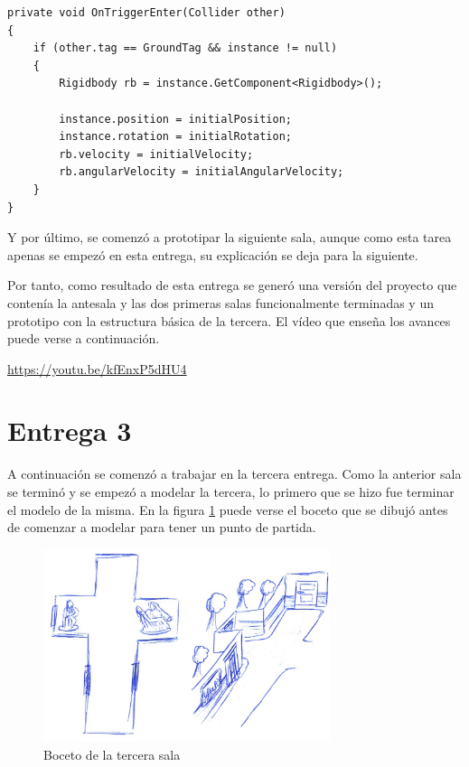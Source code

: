 \begin{lstlisting}[caption=Fragmento del script para teletransportar un objeto si toca el suelo, label=lst:object-teletransporter]
private void OnTriggerEnter(Collider other)
{
    if (other.tag == GroundTag && instance != null)
    {
        Rigidbody rb = instance.GetComponent<Rigidbody>();

        instance.position = initialPosition;
        instance.rotation = initialRotation;
        rb.velocity = initialVelocity;
        rb.angularVelocity = initialAngularVelocity;
    }
}
\end{lstlisting}


Y por último, se comenzó a prototipar la siguiente sala, aunque como esta tarea apenas se empezó en esta entrega, su explicación se deja para la siguiente.

Por tanto, como resultado de esta entrega se generó una versión del proyecto que contenía la antesala y las dos primeras salas funcionalmente terminadas y un prototipo con la estructura básica de la tercera. El vídeo que enseña los avances puede verse a continuación.

\begin{center}
    \url{https://youtu.be/kfEnxP5dHU4}
\end{center}



\section{Entrega 3}

A continuación se comenzó a trabajar en la tercera entrega. Como la anterior sala se terminó y se empezó a modelar la tercera, lo primero que se hizo fue terminar el modelo de la misma. En la figura \ref{fig:bocetos-sala-3} puede verse el boceto que se dibujó antes de comenzar a modelar para tener un punto de partida.

\begin{figure}[!h]
\begin{center}
\includegraphics[width=0.75\textwidth]{imagenes/7/bocetos/boceto-sala-3.png}
\caption{Boceto de la tercera sala}
\label{fig:bocetos-sala-3}
\end{center}
\end{figure}

